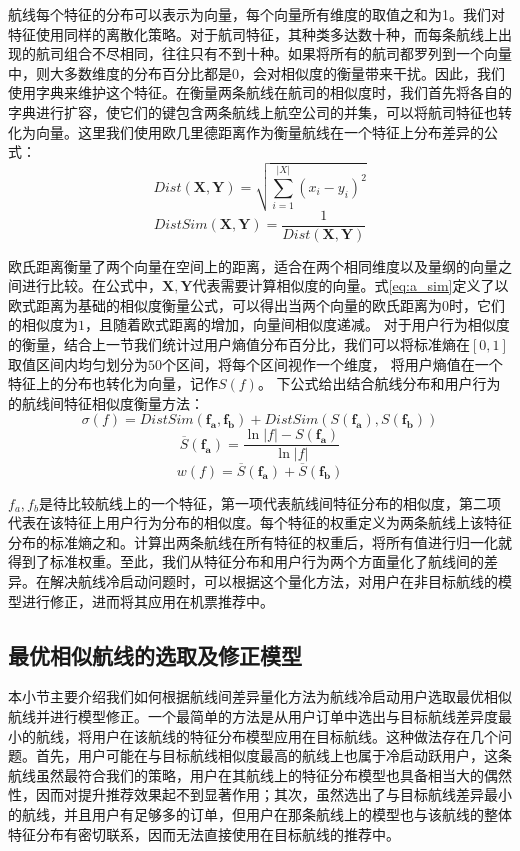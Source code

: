 航线每个特征的分布可以表示为向量，每个向量所有维度的取值之和为1。我们对特征使用同样的离散化策略。对于航司特征，其种类多达数十种，而每条航线上出现的航司组合不尽相同，往往只有不到十种。如果将所有的航司都罗列到一个向量中，则大多数维度的分布百分比都是0，会对相似度的衡量带来干扰。因此，我们使用字典来维护这个特征。在衡量两条航线在航司的相似度时，我们首先将各自的字典进行扩容，使它们的键包含两条航线上航空公司的并集，可以将航司特征也转化为向量。这里我们使用欧几里德距离作为衡量航线在一个特征上分布差异的公式：
\begin{equation}
	Dist(\mathbf{X},\mathbf{Y}) = \sqrt{\sum_{i=1}^{|X|}(x_i-y_i)^2}
\end{equation}
\begin{equation}
\label{eq:a_sim}
	DistSim(\mathbf{X},\mathbf{Y}) = \frac{1}{Dist(\mathbf{X},\mathbf{Y})}
\end{equation}

欧氏距离衡量了两个向量在空间上的距离，适合在两个相同维度以及量纲的向量之间进行比较。在公式中，$\mathbf{X}, \mathbf{Y}$代表需要计算相似度的向量。式\ref{eq:a_sim}定义了以欧式距离为基础的相似度衡量公式，可以得出当两个向量的欧氏距离为0时，它们的相似度为$1$，且随着欧式距离的增加，向量间相似度递减。
对于用户行为相似度的衡量，结合上一节我们统计过用户熵值分布百分比，我们可以将标准熵在$[0,1]$取值区间内均匀划分为$50$个区间，将每个区间视作一个维度，
将用户熵值在一个特征上的分布也转化为向量，记作$S(f)$。
下公式给出结合航线分布和用户行为的航线间特征相似度衡量方法：
\begin{equation}
	\sigma(f) = DistSim(\mathbf{f_a,f_b}) + DistSim(S(\mathbf{f_a}),S(\mathbf{f_b}))
\end{equation}
\begin{equation}
	\overline{S}(\mathbf{f_a}) = \frac{\ln |f| - S(\mathbf{f_a})}{\ln |f|}
\end{equation}
\begin{equation}
	w(f) = \overline{S}(\mathbf{f_a}) + \overline{S}(\mathbf{f_b})
\end{equation}

$f_a, f_b$是待比较航线上的一个特征，第一项代表航线间特征分布的相似度，第二项代表在该特征上用户行为分布的相似度。每个特征的权重定义为两条航线上该特征分布的标准熵之和。计算出两条航线在所有特征的权重后，将所有值进行归一化就得到了标准权重。至此，我们从特征分布和用户行为两个方面量化了航线间的差异。在解决航线冷启动问题时，可以根据这个量化方法，对用户在非目标航线的模型进行修正，进而将其应用在机票推荐中。

\subsection{最优相似航线的选取及修正模型}
本小节主要介绍我们如何根据航线间差异量化方法为航线冷启动用户选取最优相似航线并进行模型修正。一个最简单的方法是从用户订单中选出与目标航线差异度最小的航线，将用户在该航线的特征分布模型应用在目标航线。这种做法存在几个问题。首先，用户可能在与目标航线相似度最高的航线上也属于冷启动跃用户，这条航线虽然最符合我们的策略，用户在其航线上的特征分布模型也具备相当大的偶然性，因而对提升推荐效果起不到显著作用；其次，虽然选出了与目标航线差异最小的航线，并且用户有足够多的订单，但用户在那条航线上的模型也与该航线的整体特征分布有密切联系，因而无法直接使用在目标航线的推荐中。


